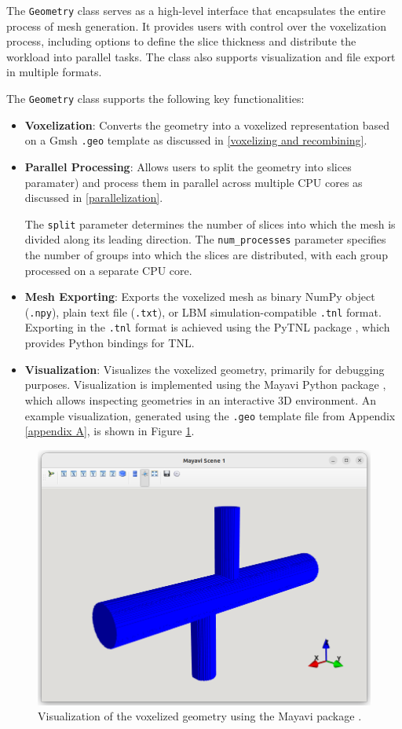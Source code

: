 The \texttt{Geometry} class serves as a high-level interface that encapsulates the entire process of mesh generation. It provides users with control over the voxelization process, including options to define the slice thickness and distribute the workload into parallel tasks. The class also supports visualization and file export in multiple formats.

The \texttt{Geometry} class supports the following key functionalities:
\begin{itemize}
	\item \textbf{Voxelization}: Converts the geometry into a voxelized representation based on a Gmsh \texttt{.geo} template as discussed in \ref{voxelizing and recombining}. 
	
	\item \textbf{Parallel Processing}: Allows users to split the geometry into slices paramater) and process them in parallel across multiple CPU cores as discussed in \ref{parallelization}.
	
	The \texttt{split} parameter determines the number of slices into which the mesh is divided along its leading direction. The \texttt{num\_processes} parameter specifies the number of groups into which the slices are distributed, with each group processed on a separate CPU core. 
	
	\item \textbf{Mesh Exporting}: Exports the voxelized mesh as binary NumPy object (\texttt{.npy}), plain text file (\texttt{.txt}), or LBM simulation-compatible \texttt{.tnl} format. Exporting in the \texttt{.tnl} format is achieved using the PyTNL package \cite{pytnl}, which provides Python bindings for TNL.
	
	\item \textbf{Visualization}: Visualizes the voxelized geometry, primarily for debugging purposes. Visualization is implemented using the Mayavi Python package \cite{mayavi}, which allows inspecting geometries in an interactive 3D environment. An example visualization, generated using the \texttt{.geo} template file from Appendix \ref{appendix A}, is shown in Figure \ref{fig:visualization}.
\end{itemize}

\begin{figure}[H]
	\centering
	\includegraphics[width=.7\textwidth]{figures/mayavi.png}
	\caption{Visualization of the voxelized geometry using the Mayavi package \cite{mayavi}.}
	\label{fig:visualization}
\end{figure}



